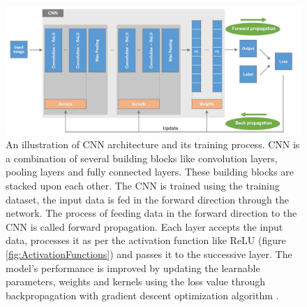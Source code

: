 \vspace*{0.3cm}
\begin{figure}[H]
        \begin{center}
	    \includegraphics[scale=0.59]{images/Fundamentals/CNNBuildingBlocks.JPG}
	    \caption[An illustration of \ac{CNN} architecture and its training process.]{An illustration of \ac{CNN} architecture and its training process. \ac{CNN} is a combination of several building blocks like convolution layers, pooling layers and fully connected layers. These building blocks are stacked upon each other. The \ac{CNN} is trained using the training dataset, the input data is fed in the forward direction through the network. The process of feeding data in the forward direction to the \ac{CNN} is called forward propagation. Each layer accepts the input data, processes it as per the activation function like \ac{ReLU} (figure \ref{fig:ActivationFunctions}) and passes it to the successive layer. The model's performance is improved by updating the learnable parameters, weights and kernels using the loss value through backpropagation with gradient descent optimization algorithm \cite{ruder2017overview}.}
	    \label{fig:CNNBuildingBlocks}
	    \end{center}
\end{figure}






